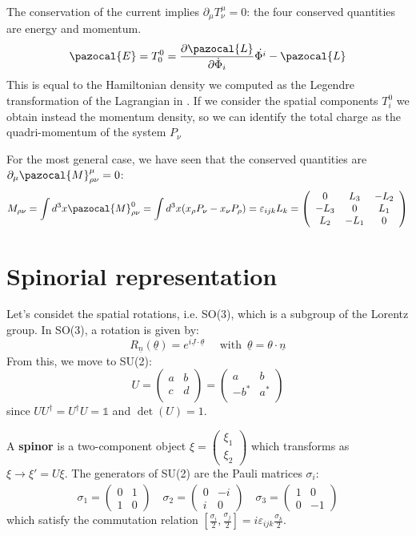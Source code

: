 \documentclass[../main.tex]{subfiles}
\begin{document}
The conservation of the current implies $\partial_\mu T^\mu_\nu=0$: the four conserved quantities are energy and momentum.
\[
\pazocal{E}=T^0_0=\frac{\partial\pazocal{L}}{\partial\Dot{\Phi}_i}\Dot{\Phi^i}-\pazocal{L}
\]
This is equal to the Hamiltonian density we computed as the Legendre transformation of the Lagrangian in . If we consider the spatial components $T^0_i$ we obtain instead the momentum density, so we can identify the total charge as the quadri-momentum of the system $P_\nu$

For the most general case, we have seen that the conserved quantities are $\partial_{\mu}\pazocal{M}^{\mu}_{\rho\nu}=0$:
\[
M_{\rho\nu}=\int d^3x\pazocal{M}^0_{\rho\nu}=\int d^3x(x_{\rho}P_{\nu}-x_{\nu}P_{\rho})=\varepsilon_{ijk}L_k=\left(\begin{array}{ccc}
    0 & L_3 & -L_2 \\
    -L_3 & 0 & L_1 \\
    L_2 & -L_1 & 0
    \end{array}\right)
\]
\section{Spinorial representation}
Let's considet the spatial rotations, i.e. SO(3), which is a subgroup of the Lorentz group. In SO(3), a rotation is given by:
\[
R_{\underline{n}}(\underline{\theta})=e^{i\underline{J}\cdot\underline{\theta}} \quad \text{ with }\, \underline{\theta}=\theta\cdot\underline{n}
\]
From this, we move to SU(2):
\[
U=\left(\begin{array}{cc}
  a & b \\
  c & d \\
\end{array}\right)=\left(\begin{array}{cc}
  a & b \\
  -b^* & a^* \\
\end{array}\right)
\]
since $UU^{\dagger}=U^{\dagger}U=\mathbb{1}$ and  $\det (U)=1$.

A \textbf{spinor} is a two-component object $\xi=\left(\begin{array}{c}
     \xi_1 \\
     \xi_2 
\end{array}\right)$ which transforms as $\xi\xrightarrow[]{}\xi'=U\xi$. The generators of SU(2) are the Pauli matrices $\sigma_i$:
\[
\sigma_1=\left(\begin{array}{cc}
    0 & 1 \\
    1 & 0
\end{array}\right) \quad \sigma_2=\left(\begin{array}{cc}
    0 & -i \\
    i & 0
\end{array}\right) \quad \sigma_3=\left(\begin{array}{cc}
    1 & 0 \\
    0 & -1
\end{array}\right)
\]
which satisfy the commutation relation $[\frac{\sigma_i}{2},\frac{\sigma_j}{2}]=i\varepsilon_{ijk}\frac{\sigma_k}{2}$. 
\end{document}
